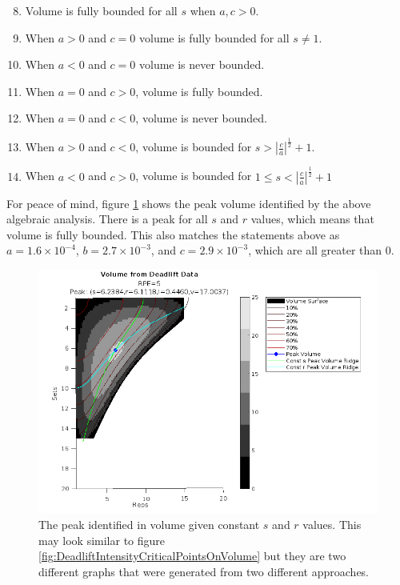 \begin{enumerate}
    \setcounter{enumi}{7}
    \item Volume is fully bounded for all $s$ when $a,c>0$.
    \item When $a>0$ and $c=0$ volume is fully bounded for all $s\ne 1$.
    \item When $a<0$ and $c=0$ volume is never bounded.
    \item When $a=0$ and $c>0$, volume is fully bounded.
    \item When $a=0$ and $c<0$, volume is never bounded.
    \item When $a>0$ and $c<0$, volume is bounded for $s>\left| \frac{c}{a} \right|^\frac{1}{2}+1$.
    \item When $a<0$ and $c>0$, volume is bounded for $1\le s < \left| \frac{c}{a} \right|^\frac{1}{2}+1$
\end{enumerate}

For peace of mind, figure \ref{fig:VolumeConstSRPeak} shows the peak volume identified by the above algebraic analysis. There is a peak for all $s$ and $r$ values, which means that volume is fully bounded. This also matches the statements above as $a=1.6\times 10^{-4}$, $b=2.7\times 10^{-3}$, and $c=2.9\times 10^{-3}$, which are all greater than $0$.

\begin{figure}[h]
    \centering
    \includegraphics[width=170mm]{DeadliftVolume/FailedRidgeIdentification-2.png}
    \caption{The peak identified in volume given constant $s$ and $r$ values. This may look similar to figure \ref{fig:DeadliftIntensityCriticalPointsOnVolume} but they are two different graphs that were generated from two different approaches.}
    \label{fig:VolumeConstSRPeak}
\end{figure}

